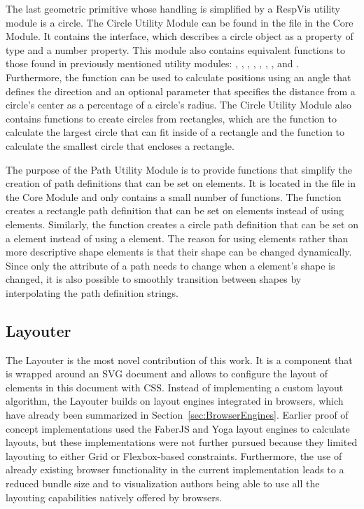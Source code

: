 The last geometric primitive whose handling is simplified by a RespVis utility module is a circle.
The Circle Utility Module can be found in the  file in the Core Module.
It contains the  interface, which describes a circle object as a  property of type  and a  number property.
This module also contains equivalent functions to those found in previously mentioned utility modules: , , , , , , , and .
Furthermore, the  function can be used to calculate positions using an angle that defines the direction and an optional parameter that specifies the distance from a circle's center as a percentage of a circle's radius.
The Circle Utility Module also contains functions to create circles from rectangles, which are the  function to calculate the largest circle that can fit inside of a rectangle and the  function to calculate the smallest circle that encloses a rectangle.

The purpose of the Path Utility Module is to provide functions that simplify the creation of path definitions that can be set on  elements.
It is located in the  file in the Core Module and only contains a small number of functions.
The  function creates a rectangle path definition that can be set on  elements instead of using  elements.
Similarly, the  function creates a circle path definition that can be set on a  element instead of using a  element.
The reason for using  elements rather than more descriptive shape elements is that their shape can be changed dynamically.
Since only the  attribute of a path needs to change when a  element's shape is changed, it is also possible to smoothly transition between shapes by interpolating the path definition strings.

\subsection{Layouter}
\label{sec:Layouter}

The Layouter is the most novel contribution of this work.
It is a component that is wrapped around an SVG document and allows to configure the layout of elements in this document with CSS.
Instead of implementing a custom layout algorithm, the Layouter builds on layout engines integrated in browsers, which have already been summarized in Section~\ref{sec:BrowserEngines}.
Earlier proof of concept implementations used the FaberJS \parencite{FaberJS} and Yoga \parencite{Yoga} layout engines to calculate layouts, but these implementations were not further pursued because they limited layouting to either Grid or Flexbox-based constraints.
Furthermore, the use of already existing browser functionality in the current implementation leads to a reduced bundle size and to visualization authors being able to use all the layouting capabilities natively offered by browsers.

